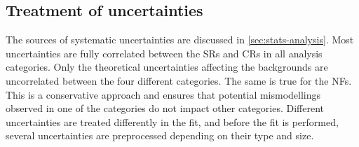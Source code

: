 
\subsection{Treatment of uncertainties}
The sources of systematic uncertainties are discussed in \cref{sec:stats-analysis}. 
Most uncertainties are fully correlated between the SRs and CRs in all analysis categories. Only the theoretical uncertainties affecting the backgrounds are uncorrelated between the four different categories. The same is true for the NFs. This is a conservative approach and ensures that potential mismodellings observed in one of the categories do not impact other categories. 
Different uncertainties are treated differently in the fit, and before the fit is performed, several uncertainties are preprocessed depending on their type and size. 

